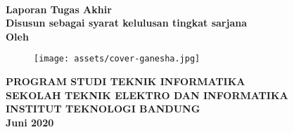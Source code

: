 \clearpage
\pagestyle{empty}


{\selectfont%
\begin{center}
    
    \smallskip

    \large{\bfseries \MakeUppercase{\thetitle}}
    \\[2\baselineskip]

    \large{\bfseries Laporan Tugas Akhir}
    \\[\baselineskip]

    \normalsize{ \bfseries
    	Disusun sebagai syarat kelulusan tingkat sarjana
	}
    \\[3\baselineskip]

    \normalsize{ \bfseries Oleh\\}
    \large{ \bfseries \MakeUppercase{\theauthor}}

    \vfill
    \begin{figure}[h]
        \centering
      	\texttt{[image: assets/cover-ganesha.jpg]}
    \end{figure}
    \vfill

    \large{ \bfseries
	    \uppercase{
	        Program Studi Teknik Informatika \\
	        Sekolah Teknik Elektro dan Informatika \\
	        Institut Teknologi Bandung\\
	    }
    	Juni 2020
	}

\end{center}
}%

\restoregeometry
\clearpage
